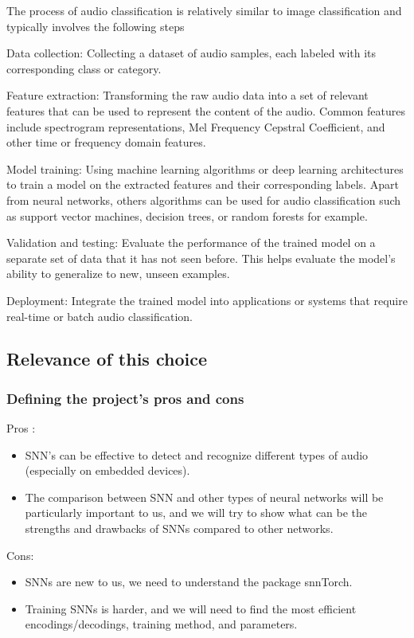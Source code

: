 \documentclass[11pt]{article}
\begin{document}
The process of audio classification is relatively similar to image classification and typically involves the following steps

Data collection: Collecting a dataset of audio samples, each labeled with its corresponding class or category.

Feature extraction: Transforming the raw audio data into a set of relevant features that can be used to represent the content of the audio. Common features include spectrogram representations, Mel Frequency Cepstral Coefficient, and other time or frequency domain features.

Model training: Using machine learning algorithms or deep learning architectures to train a model on the extracted features and their corresponding labels. Apart from neural networks, others algorithms can be used for audio classification such as support vector machines, decision trees, or random forests for example.

Validation and testing: Evaluate the performance of the trained model on a separate set of data that it has not seen before. This helps evaluate the model's ability to generalize to new, unseen examples.

Deployment: Integrate the trained model into applications or systems that require real-time or batch audio classification.

\subsection{Relevance of this choice}
\subsubsection{Defining the project's pros and cons}
Pros :
\begin{itemize}
  \item SNN's can be effective to detect and recognize different types of audio (especially on embedded devices).
  \item The comparison between SNN and other types of neural networks will be particularly important to us, and we will try to show what can be the strengths and drawbacks of SNNs compared to other networks.
\end{itemize}

Cons:

\begin{itemize}
  \item SNNs are new to us, we need to understand the package snnTorch.
  \item Training SNNs is harder, and we will need to find the most efficient encodings/decodings, training method, and parameters.
\end{itemize}
\end{document}
